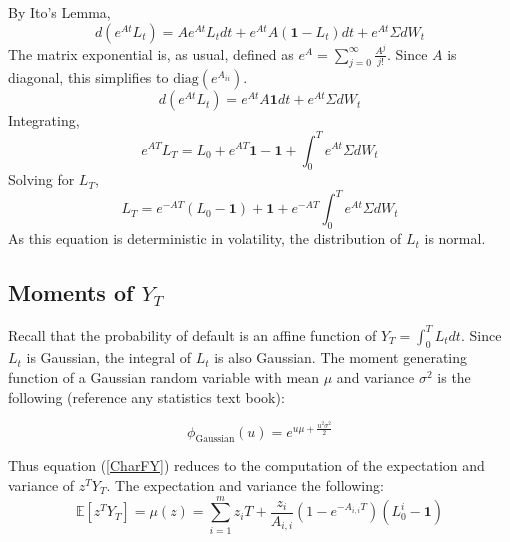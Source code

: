 \documentclass[12pt]{article}
\theoremstyle{definition}
\begin{document}
By Ito's Lemma, 
\begin{equation} d\left(e^{{A}t}{L_t}\right)={A}e^{{A}t}{L_t}dt+e^{{A}t}{A} (\mathbf{1}-{L_t}) dt +e^{{A}t}{\Sigma}d {W_t} \end{equation}
The matrix exponential is, as usual, defined as \(e^{{A}}=\sum_{j=0} ^ \infty \frac{{A}^j }{j!}\).  Since \({A}\) is diagonal, this simplifies to \(\text{diag}\left(e^{A_{ii}}\right)\).
\begin{equation} d\left(e^{{A}t}{L_t}\right)=e^{{A}t}{A} \mathbf{1} dt +e^{{A}t}{\Sigma}d {W_t} \end{equation}
Integrating,
\begin{equation} e^{{A}T}{L_T}=L_0+e^{AT} \mathbf{1}-\mathbf{1}+\int_0 ^ T e^{{A}t} {\Sigma}d {W_t} \end{equation}
Solving for \(L_T\),
\begin{equation} \label{solutionL} {L_T}=e^{-AT}(L_0-\mathbf{1})+ \mathbf{1}+e^{-AT}\int_0 ^ T e^{{A}t} {\Sigma}d {W_t} \end{equation}
As this equation is deterministic in volatility, the distribution of \(L_t\) is normal.  

\subsection{Moments of \(Y_T\)} 

Recall that the probability of default is an affine function of \(Y_T=\int_0^T L_t dt\).  Since \(L_t\) is Gaussian, the integral of \(L_t\) is also Gaussian.  The moment generating function of a Gaussian random variable with mean \(\mu\) and variance \(\sigma^2\) is the following (reference any statistics text book):

\begin{equation}\phi_{\mathrm{Gaussian}}(u)=\label{GaussianMGF} e^{u\mu +\frac{u^2\sigma^2}{2}} \end{equation}

Thus equation (\ref{CharFY}) reduces to the computation of the expectation and variance of \(z^T Y_T\).  The expectation and variance the following:
\begin{equation} \mathbb{E}[z^T Y_T]=\mu(z)=\sum_{i=1} ^ m z_i T+\frac{z_i}{A_{i,i}}\left(1-e^{-{A}_{i, i}T}\right)(L_0^ i-\mathbf{1})\end{equation}
\end{document}
